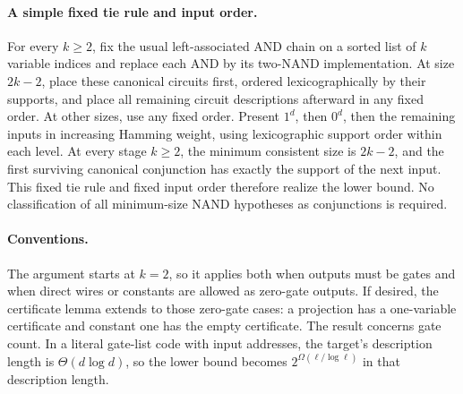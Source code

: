 \paragraph{A simple fixed tie rule and input order.}
For every $k\ge2$, fix the usual left-associated AND chain on a sorted
list of $k$ variable indices and replace each AND by its two-NAND
implementation. At size $2k-2$, place these canonical circuits first,
ordered lexicographically by their supports, and place all remaining
circuit descriptions afterward in any fixed order. At other sizes,
use any fixed order. Present $1^d$, then $0^d$, then the remaining inputs in
increasing Hamming weight, using lexicographic support order within
each level. At every stage $k\ge2$, the minimum consistent size is
$2k-2$, and the first surviving canonical conjunction has exactly the
support of the next input. This fixed tie rule and fixed input order
therefore realize the lower bound. No classification of all
minimum-size NAND hypotheses as conjunctions is required.

\paragraph{Conventions.}
The argument starts at $k=2$, so it applies both when outputs must be
gates and when direct wires or constants are allowed as zero-gate
outputs. If desired, the certificate lemma extends to those
zero-gate cases: a projection has a one-variable certificate and
constant one has the empty certificate. The result concerns gate
count. In a literal gate-list code with input addresses, the target's
description length is $\Theta(d\log d)$, so the lower bound becomes
$2^{\Omega(\ell/\log\ell)}$ in that description length.
